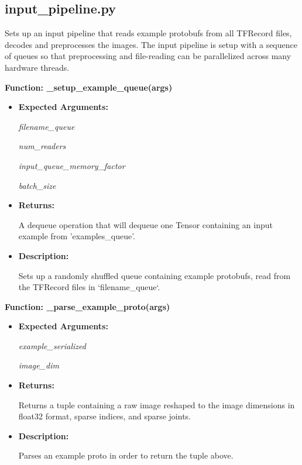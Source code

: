 \documentclass{scrreprt}
\begin{document}
\subsection{input_pipeline.py}
Sets up an input pipeline that reads example protobufs from all TFRecord files, decodes and preprocesses the images. The input pipeline is setup with a sequence of queues so that preprocessing and file-reading can be parallelized across many hardware threads.

\textbf{Function: \_setup\_example\_queue(args)}
\begin{itemize}
    \item \textbf{Expected Arguments:}

            \quad\textit{filename\_queue}

            \quad\textit{num\_readers}

            \quad\textit{input\_queue\_memory\_factor}

            \quad\textit{batch\_size}

    \item \textbf{Returns:}

            A dequeue operation that will dequeue one Tensor containing  an input example from 'examples\_queue'.        

    \item \textbf{Description:}

            Sets up a randomly shuffled queue containing example protobufs, read from the TFRecord files in `filename\_queue`.

\end{itemize}

\textbf{Function: \_parse\_example\_proto(args)}
\begin{itemize}
    \item \textbf{Expected Arguments:}

            \quad\textit{example\_serialized}

            \quad\textit{image\_dim}

    \item \textbf{Returns:}

            Returns a tuple containing a raw image reshaped to the image dimensions in float32 format, sparse indices, and sparse joints.

    \item \textbf{Description:}

            Parses an example proto in order to return the tuple above.

\end{itemize}
\end{document}
